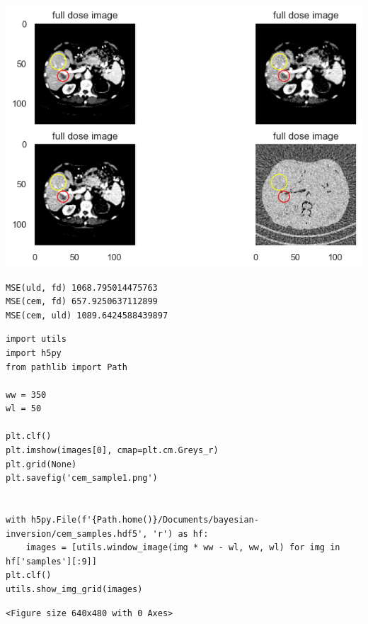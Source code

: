 \documentclass[a4paper, 11pt]{article}
\begin{document}
\begin{center}
\includegraphics[width=.9\linewidth]{./.ob-jupyter/dbe91531a48181690bce1199a78c3b0780d4a125.png}
\end{center}
\begin{verbatim}
MSE(uld, fd) 1068.795014475763
MSE(cem, fd) 657.9250637112899
MSE(cem, uld) 1089.6424588439897
\end{verbatim}


\begin{verbatim}
import utils
import h5py
from pathlib import Path

ww = 350
wl = 50

plt.clf()
plt.imshow(images[0], cmap=plt.cm.Greys_r)
plt.grid(None)
plt.savefig('cem_sample1.png')


with h5py.File(f'{Path.home()}/Documents/bayesian-inversion/cem_samples.hdf5', 'r') as hf:
    images = [utils.window_image(img * ww - wl, ww, wl) for img in hf['samples'][:9]]
plt.clf()
utils.show_img_grid(images)

\end{verbatim}

\begin{verbatim}
<Figure size 640x480 with 0 Axes>
\end{verbatim}
\end{document}
